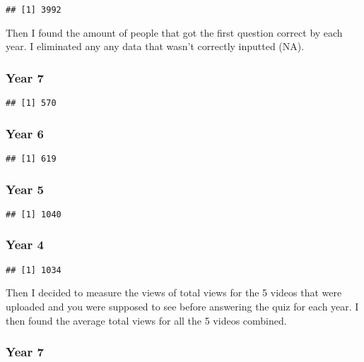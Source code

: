 \documentclass[
]{article}
\begin{document}
\begin{verbatim}
## [1] 3992
\end{verbatim}

Then I found the amount of people that got the first question correct by
each year. I eliminated any any data that wasn't correctly inputted
(NA).

\hypertarget{year-7-1}{%
\subsubsection{Year 7}\label{year-7-1}}

\begin{verbatim}
## [1] 570
\end{verbatim}

\hypertarget{year-6-1}{%
\subsubsection{Year 6}\label{year-6-1}}

\begin{verbatim}
## [1] 619
\end{verbatim}

\hypertarget{year-5-1}{%
\subsubsection{Year 5}\label{year-5-1}}

\begin{verbatim}
## [1] 1040
\end{verbatim}

\hypertarget{year-4-1}{%
\subsubsection{Year 4}\label{year-4-1}}

\begin{verbatim}
## [1] 1034
\end{verbatim}

Then I decided to measure the views of total views for the 5 videos that
were uploaded and you were supposed to see before answering the quiz for
each year. I then found the average total views for all the 5 videos
combined.

\hypertarget{year-7-2}{%
\subsubsection{Year 7}\label{year-7-2}}
\end{document}
